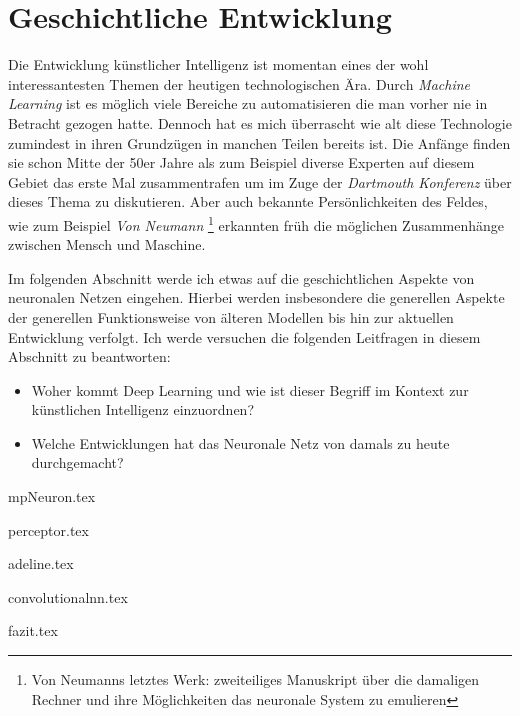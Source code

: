 \part{Geschichtliche Entwicklung}

Die Entwicklung künstlicher Intelligenz ist momentan eines der wohl interessantesten Themen der heutigen technologischen Ära. Durch \emph{Machine Learning} ist es möglich viele Bereiche zu automatisieren die man vorher nie in Betracht gezogen hatte. Dennoch hat es mich überrascht wie \glqq alt \grqq diese Technologie zumindest in ihren Grundzügen in manchen Teilen bereits ist. Die Anfänge finden sie schon Mitte der 50er Jahre als zum Beispiel diverse Experten auf diesem Gebiet das erste Mal zusammentrafen um im Zuge der \emph{Dartmouth Konferenz} über dieses Thema zu diskutieren. Aber auch bekannte Persönlichkeiten des Feldes, wie zum Beispiel \emph{Von Neumann} \footnote{Von Neumanns letztes Werk: zweiteiliges Manuskript über die damaligen Rechner und ihre Möglichkeiten das neuronale System zu emulieren} erkannten früh die möglichen Zusammenhänge zwischen Mensch und Maschine.

Im folgenden Abschnitt werde ich etwas auf die geschichtlichen Aspekte von neuronalen Netzen eingehen. Hierbei werden insbesondere die generellen Aspekte der generellen Funktionsweise von älteren Modellen bis hin zur aktuellen Entwicklung verfolgt. Ich werde versuchen die folgenden Leitfragen in diesem Abschnitt zu beantworten: 

\begin{itemize}
\item Woher kommt Deep Learning und wie ist dieser Begriff im Kontext zur künstlichen Intelligenz einzuordnen?
\item Welche Entwicklungen hat das Neuronale Netz von damals zu heute durchgemacht?
\end{itemize}


{mpNeuron.tex}
\clearpage

{perceptor.tex}
\clearpage

{adeline.tex}
\clearpage

{convolutionalnn.tex}
\clearpage

{fazit.tex}